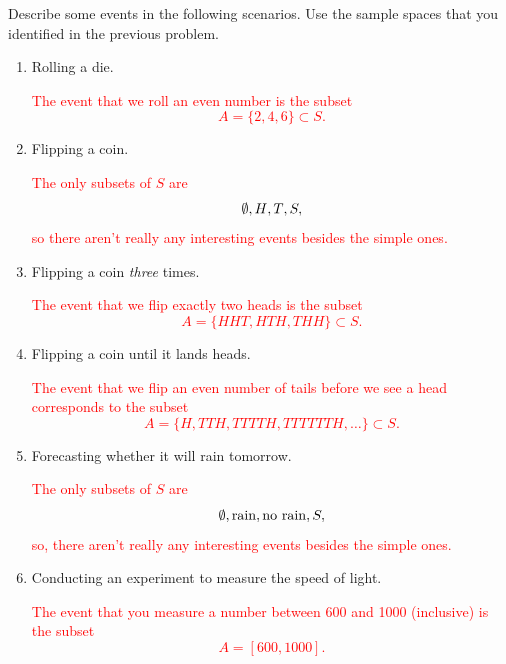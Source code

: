 \documentclass[12pt,reqno]{amsart}
\begin{document}
\bigskip
\prob Describe some events in the following scenarios. Use the sample spaces that you identified in the previous problem.

\medskip
\begin{enumerate}
\item Rolling a die.
    
\bigskip
\textcolor{red}{The event that we roll an even number is the subset
	\[
	A = \{2, 4, 6\} \subset S.
	\]}
\bigskip

\item Flipping a coin.
    
\bigskip
\textcolor{red}{The only subsets of $S$ are
	\[
	\emptyset, \\{H\\}, \\{T\\}, S,
	\]
so there aren't really any interesting events besides the simple ones.}
\bigskip

\item Flipping a coin \textit{three} times.
    
\bigskip
\textcolor{red}{The event that we flip exactly two heads is the subset
	\[
	A = \{HHT, HTH, THH\}\subset S.
	\]}
\bigskip

\item Flipping a coin until it lands heads.
    
\bigskip
\textcolor{red}{The event that we flip an even number of tails before we see a head corresponds to the subset
	\[
	A = \{ H, TTH, TTTTH, TTTTTTH, \ldots\} \subset S.
	\]}
\bigskip

\item Forecasting whether it will rain tomorrow.
    
\bigskip
\textcolor{red}{The only subsets of $S$ are
	\[
	\emptyset, \\{\text{rain}\\}, \\{\text{no rain}\\}, S,
	\]
so, there aren't really any interesting events besides the simple ones.}
\bigskip

\item Conducting an experiment to measure the speed of light.
    
\bigskip
\textcolor{red}{The event that you measure a number between 600 and 1000 (inclusive) is the subset
	\[
	A = [600, 1000].
	\]}
\end{enumerate}
\end{document}

